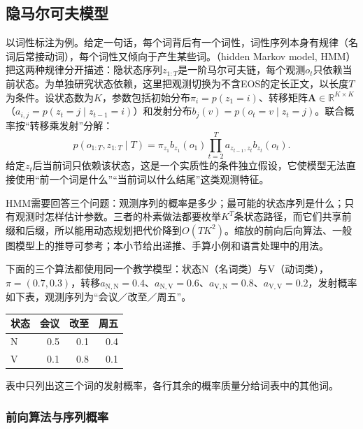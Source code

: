 \subsection{隐马尔可夫模型}
\label{sec:nlp-classical-hmm}

以词性标注为例。给定一句话，每个词背后有一个词性，词性序列本身有规律（名词后常接动词），每个词性又倾向于产生某些词。（hidden Markov model, HMM）把这两种规律分开描述：隐状态序列$z_{1:T}$是一阶马尔可夫链，每个观测$o_t$只依赖当前状态。为单独研究状态依赖，这里把观测切换为不含EOS的定长正文，以长度$T$为条件。设状态数为$K$，参数包括初始分布$\pi_i=p(z_1=i)$、转移矩阵$\bm A\in\mathbb R^{K\times K}$（$a_{i,j}=p(z_t=j\mid z_{t-1}=i)$）和发射分布$b_j(v)=p(o_t=v\mid z_t=j)$。联合概率按“转移乘发射”分解：
\begin{equation}
  p(o_{1:T},z_{1:T}\mid T)=\pi_{z_1}b_{z_1}(o_1)\prod_{t=2}^{T}a_{z_{t-1},z_t}b_{z_t}(o_t).
  \label{eq:nlp-classical-hmm}
\end{equation}
给定$z_t$后当前词只依赖该状态，这是一个实质性的条件独立假设，它使模型无法直接使用“前一个词是什么”“当前词以什么结尾”这类观测特征。

HMM需要回答三个问题：观测序列的概率是多少；最可能的状态序列是什么；只有观测时怎样估计参数。三者的朴素做法都要枚举$K^T$条状态路径，而它们共享前缀和后缀，所以能用动态规划把代价降到$O(TK^2)$。缩放的前向后向算法、一般图模型上的推导可参考；本小节给出递推、手算小例和语言处理中的用法。

下面的三个算法都使用同一个教学模型：状态N（名词类）与V（动词类），$\pi=(0.7,0.3)$，转移$a_{\mathrm{N},\mathrm{N}}=0.4$、$a_{\mathrm{N},\mathrm{V}}=0.6$、$a_{\mathrm{V},\mathrm{N}}=0.8$、$a_{\mathrm{V},\mathrm{V}}=0.2$，发射概率如下表，观测序列为“会议／改至／周五”。
\begin{center}
\begin{tabular}{@{}lrrr@{}}
\toprule
状态 & 会议 & 改至 & 周五\\
\midrule
N & 0.5 & 0.1 & 0.4\\
V & 0.1 & 0.8 & 0.1\\
\bottomrule
\end{tabular}
\end{center}
表中只列出这三个词的发射概率，各行其余的概率质量分给词表中的其他词。

\subsubsection{前向算法与序列概率}
\label{sec:nlp-classical-forward}

